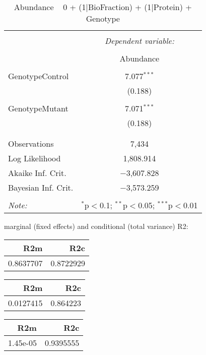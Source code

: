 \documentclass[11pt]{report}
\begin{document}
\begin{table}[!htbp] \centering 
  \caption{Abundance ~ 0 + (1|BioFraction) + (1|Protein) + Genotype} 
  \label{} 
\begin{tabular}{@{\extracolsep{5pt}}lc} 
\\[-1.8ex]\hline 
\hline \\[-1.8ex] 
 & \multicolumn{1}{c}{\textit{Dependent variable:}} \\ 
\cline{2-2} 
\\[-1.8ex] & Abundance \\ 
\hline \\[-1.8ex] 
 GenotypeControl & 7.077$^{***}$ \\ 
  & (0.188) \\ 
  & \\ 
 GenotypeMutant & 7.071$^{***}$ \\ 
  & (0.188) \\ 
  & \\ 
\hline \\[-1.8ex] 
Observations & 7,434 \\ 
Log Likelihood & 1,808.914 \\ 
Akaike Inf. Crit. & $-$3,607.828 \\ 
Bayesian Inf. Crit. & $-$3,573.259 \\ 
\hline 
\hline \\[-1.8ex] 
\textit{Note:}  & \multicolumn{1}{r}{$^{*}$p$<$0.1; $^{**}$p$<$0.05; $^{***}$p$<$0.01} \\ 
\end{tabular} 
\end{table} 
marginal (fixed effects) and conditional (total variance) R2:

\begin{tabular}{r|r}
\hline
R2m & R2c\\
\hline
0.8637707 & 0.8722929\\
\hline
\end{tabular}

\begin{tabular}{r|r}
\hline
R2m & R2c\\
\hline
0.0127415 & 0.864223\\
\hline
\end{tabular}

\begin{tabular}{r|r}
\hline
R2m & R2c\\
\hline
1.45e-05 & 0.9395555\\
\hline
\end{tabular}
\end{document}
